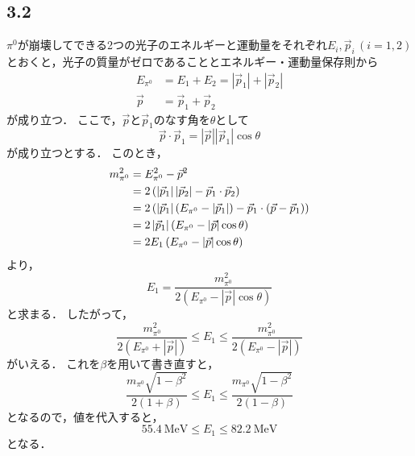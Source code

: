 \subsection*{3.2}
$\pi^0$が崩壊してできる2つの光子のエネルギーと運動量をそれぞれ$E_i, \vec{p}_i\,(i=1,2)$とおくと，光子の質量がゼロであることとエネルギー・運動量保存則から
\begin{align}
  E_{\pi^0} &= E_1 + E_2 = \left|\vec{p}_1\right| + \left|\vec{p}_2\right|\\
  \vec{p} &= \vec{p}_1 + \vec{p}_2
\end{align}
が成り立つ．
ここで，$\vec{p}$と$\vec{p}_1$のなす角を$\theta$として
\begin{equation}
  \vec{p}\cdot \vec{p}_1 =   \left|\vec{p}\right|\left|\vec{p}_1\right|\cos{\theta}
\end{equation}
が成り立つとする．
このとき，
\begin{align}
  m_{\pi^0}^2 &= E_{\pi^0}^2 - \vec{p}^2 \notag\\
  &= 2\left(\left|\vec{p}_1\right|\left|\vec{p}_2\right| - \vec{p}_1\cdot \vec{p}_2\right) \notag\\
  &= 2\left(\left|\vec{p}_1\right|\left(E_{\pi^0} - \left|\vec{p}_1\right|\right) - \vec{p}_1\cdot \left(\vec{p}-\vec{p}_1\right)\right) \notag\\
  &= 2\left|\vec{p}_1\right| \left(E_{\pi^0} - \left|\vec{p}\right|\cos{\theta}\right) \notag\\
  &= 2E_1 \left(E_{\pi^0} - \left|\vec{p}\right|\cos{\theta}\right)
\end{align}
より，
\begin{equation}
  E_1 = \frac{m_{\pi^0}^2}{2(E_{\pi^0}-\left|\vec{p}\right|\cos{\theta})}
\end{equation}
と求まる．
したがって，
\begin{equation}
  \frac{m_{\pi^0}^2}{2(E_{\pi^0} + \left|\vec{p}\right|)}\le E_1 \le \frac{m_{\pi^0}^2}{2(E_{\pi^0} - \left|\vec{p}\right|)}
\end{equation}
がいえる．
これを$\beta$を用いて書き直すと，
\begin{equation}
  \frac{m_{\pi^0}\sqrt{1-\beta^2}}{2(1+\beta)}\le E_1 \le \frac{m_{\pi^0}\sqrt{1-\beta^2}}{2(1-\beta)}
\end{equation}
となるので，値を代入すると，
\begin{equation}
  \SI{55.4}{\MeV} \le E_1 \le \SI{82.2}{\MeV}
\end{equation}
となる．